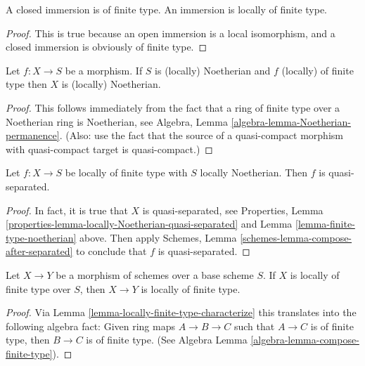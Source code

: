 \begin{lemma}
\label{lemma-immersion-locally-finite-type}
A closed immersion is of finite type.
An immersion is locally of finite type.
\end{lemma}

\begin{proof}
This is true because an open immersion is a local isomorphism,
and a closed immersion is obviously of finite type.
\end{proof}

\begin{lemma}
\label{lemma-finite-type-noetherian}
Let $f : X \to S$ be a morphism.
If $S$ is (locally) Noetherian and $f$ (locally) of finite type
then $X$ is (locally) Noetherian.
\end{lemma}

\begin{proof}
This follows immediately from the fact that a ring
of finite type over a Noetherian ring is Noetherian,
see Algebra, Lemma \ref{algebra-lemma-Noetherian-permanence}.
(Also: use the fact that the source of a quasi-compact morphism
with quasi-compact target is quasi-compact.)
\end{proof}

\begin{lemma}
\label{lemma-finite-type-Noetherian-quasi-separated}
Let $f : X \to S$ be locally of finite type with $S$ locally Noetherian.
Then $f$ is quasi-separated.
\end{lemma}

\begin{proof}
In fact, it is true that $X$ is quasi-separated, see
Properties, Lemma \ref{properties-lemma-locally-Noetherian-quasi-separated}
and Lemma \ref{lemma-finite-type-noetherian} above.
Then apply Schemes, Lemma \ref{schemes-lemma-compose-after-separated}
to conclude that $f$ is quasi-separated.
\end{proof}

\begin{lemma}
\label{lemma-permanence-finite-type}
Let $X \to Y$ be a morphism of schemes over a base scheme $S$.
If $X$ is locally of finite type over $S$, then $X \to Y$
is locally of finite type.
\end{lemma}

\begin{proof}
Via Lemma \ref{lemma-locally-finite-type-characterize} this translates
into the following algebra
fact: Given ring maps $A \to B \to C$ such that $A \to C$ is
of finite type, then $B \to C$ is of finite type.
(See Algebra Lemma \ref{algebra-lemma-compose-finite-type}).
\end{proof}







